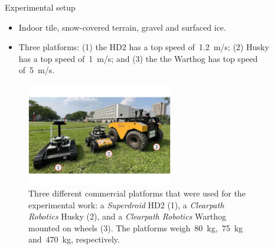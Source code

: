 \documentclass[final,hyperref={pdfpagelabels=false}]{beamer}
\begin{document}
\begin{frame}[t]
\begin{columns}[t]
\begin{column}{.465\textwidth}

\end{column} %

\begin{column}{.03\textwidth}\end{column} %
 
\begin{column}{.465\textwidth} %


\vspace{-12.5mm}
\begin{block}{Experimental setup}
	\begin{itemize}
		\item Indoor tile, snow-covered terrain, gravel and surfaced ice.
		\item Three platforms: (1) the HD2 has a top speed of~\SI{1.2}{\meter / \second}; (2) Husky has a top speed of~\SI{1}{\meter / \second}; and (3) the the Warthog has top speed of~\SI{5}{\meter / \second}.    
		
	\end{itemize}
	\begin{figure}%
		\begin{minipage}[b]{.34\textwidth}%
			\caption{
				Three different commercial platforms that were used for the experimental work:
				a \emph{Superdroid} HD2 (1), a \emph{Clearpath Robotics} Husky (2), and a \emph{Clearpath Robotics} Warthog mounted
				on wheels (3). 
				The platforms weigh~\SI{80}{\kilo\gram},~\SI{75}{\kilo\gram} and~\SI{470}{\kilo\gram}, respectively.
			}
		\end{minipage}%
		\includegraphics[width=0.63\textwidth]{./figures/norlab_robots_with_labels.pdf}
	\end{figure}
\end{block}



\end{column}
\end{columns}
\end{frame}
\end{document}
